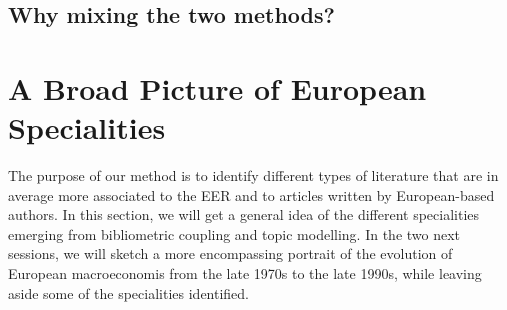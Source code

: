 \documentclass[]{elsarticle} %
\begin{document}
\hypertarget{why-mixing-the-two-methods}{%
\subsection{Why mixing the two
methods?}\label{why-mixing-the-two-methods}}

\hypertarget{a-broad-picture-of-european-specialities}{%
\section{A Broad Picture of European
Specialities}\label{a-broad-picture-of-european-specialities}}

The purpose of our method is to identify different types of literature
that are in average more associated to the EER and to articles written
by European-based authors. In this section, we will get a general idea
of the different specialities emerging from bibliometric coupling and
topic modelling. In the two next sessions, we will sketch a more
encompassing portrait of the evolution of European macroeconomis from
the late 1970s to the late 1990s, while leaving aside some of the
specialities identified.
\end{document}
